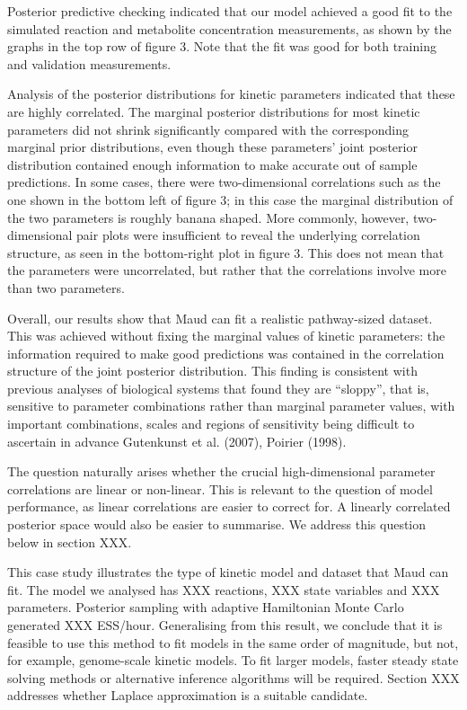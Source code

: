 \documentclass[
  letterpaper,
  DIV=11,
  numbers=noendperiod]{scrartcl}
\begin{document}
Posterior predictive checking indicated that our model achieved a good
fit to the simulated reaction and metabolite concentration measurements,
as shown by the graphs in the top row of figure 3. Note that the fit was
good for both training and validation measurements.

Analysis of the posterior distributions for kinetic parameters indicated
that these are highly correlated. The marginal posterior distributions
for most kinetic parameters did not shrink significantly compared with
the corresponding marginal prior distributions, even though these
parameters' joint posterior distribution contained enough information to
make accurate out of sample predictions. In some cases, there were
two-dimensional correlations such as the one shown in the bottom left of
figure 3; in this case the marginal distribution of the two parameters
is roughly banana shaped. More commonly, however, two- dimensional pair
plots were insufficient to reveal the underlying correlation structure,
as seen in the bottom-right plot in figure 3. This does not mean that
the parameters were uncorrelated, but rather that the correlations
involve more than two parameters.

Overall, our results show that Maud can fit a realistic pathway-sized
dataset. This was achieved without fixing the marginal values of kinetic
parameters: the information required to make good predictions was
contained in the correlation structure of the joint posterior
distribution. This finding is consistent with previous analyses of
biological systems that found they are ``sloppy'', that is, sensitive to
parameter combinations rather than marginal parameter values, with
important combinations, scales and regions of sensitivity being
difficult to ascertain in advance Gutenkunst et al. (2007), Poirier
(1998).

The question naturally arises whether the crucial high-dimensional
parameter correlations are linear or non-linear. This is relevant to the
question of model performance, as linear correlations are easier to
correct for. A linearly correlated posterior space would also be easier
to summarise. We address this question below in section XXX.

This case study illustrates the type of kinetic model and dataset that
Maud can fit. The model we analysed has XXX reactions, XXX state
variables and XXX parameters. Posterior sampling with adaptive
Hamiltonian Monte Carlo generated XXX ESS/hour. Generalising from this
result, we conclude that it is feasible to use this method to fit models
in the same order of magnitude, but not, for example, genome-scale
kinetic models. To fit larger models, faster steady state solving
methods or alternative inference algorithms will be required. Section
XXX addresses whether Laplace approximation is a suitable candidate.
\end{document}
